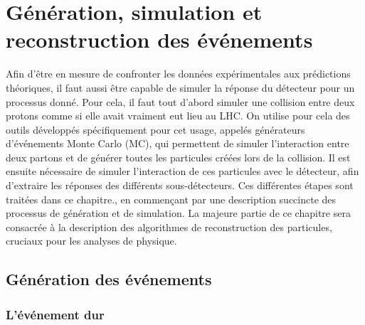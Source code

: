 \chapter{Génération, simulation et reconstruction des événements} \label{chap:reco}

Afin d'être en mesure de confronter les données expérimentales aux prédictions théoriques, il faut aussi être capable de simuler la réponse du détecteur pour un processus donné. Pour cela, il faut tout d'abord simuler une collision entre deux protons comme si elle avait vraiment eut lieu au LHC. On utilise pour cela des outils développés spécifiquement pour cet usage, appelés générateurs d'événements Monte Carlo (MC), qui permettent de simuler l'interaction entre deux partons et de générer toutes les particules créées lors de la collision. Il est ensuite nécessaire de simuler l'interaction de ces particules avec le détecteur, afin d'extraire les réponses des différents sous-détecteurs. Ces différentes étapes sont traitées dans ce chapitre., en commençant par une description succincte des processus de génération et de simulation. La majeure partie de ce chapitre sera consacrée à la description des algorithmes de reconstruction des particules, cruciaux pour les analyses de physique.

\section{Génération des événements}




\subsection{L'événement dur}

